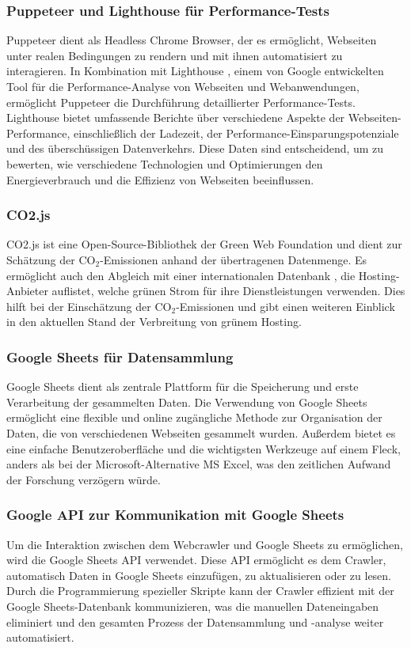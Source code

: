 \documentclass[Bachelor,BIF,german,IEEE]{BASE/twbook}
\begin{document}
\subsubsection{Puppeteer und Lighthouse für Performance-Tests}
Puppeteer \cite{PPTR24} dient als Headless Chrome Browser, der es ermöglicht, Webseiten unter realen Bedingungen zu rendern und mit ihnen automatisiert zu interagieren. In Kombination mit Lighthouse \cite{GLH24}, einem von Google entwickelten Tool für die Performance-Analyse von Webseiten und Webanwendungen, ermöglicht Puppeteer die Durchführung detaillierter Performance-Tests. Lighthouse bietet umfassende Berichte über verschiedene Aspekte der Webseiten-Performance, einschließlich der Ladezeit, der Performance-Einsparungspotenziale und des überschüssigen Datenverkehrs. Diese Daten sind entscheidend, um zu bewerten, wie verschiedene Technologien und Optimierungen den Energieverbrauch und die Effizienz von Webseiten beeinflussen.

\subsubsection{CO2.js}
CO2.js \cite{CO2JS24} ist eine Open-Source-Bibliothek der Green Web Foundation und dient zur Schätzung der CO$_2$-Emissionen anhand der übertragenen Datenmenge. Es ermöglicht auch den Abgleich mit einer internationalen Datenbank \cite{GHDB24}, die Hosting-Anbieter auflistet, welche grünen Strom für ihre Dienstleistungen verwenden. Dies hilft bei der Einschätzung der CO$_2$-Emissionen und gibt einen weiteren Einblick in den aktuellen Stand der Verbreitung von grünem Hosting.

\subsubsection{Google Sheets für Datensammlung}
Google Sheets dient als zentrale Plattform für die Speicherung und erste Verarbeitung der gesammelten Daten. Die Verwendung von Google Sheets ermöglicht eine flexible und online zugängliche Methode zur Organisation der Daten, die von verschiedenen Webseiten gesammelt wurden. Außerdem bietet es eine einfache Benutzeroberfläche und die wichtigsten Werkzeuge auf einem Fleck, anders als bei der Microsoft-Alternative MS Excel, was den zeitlichen Aufwand der Forschung verzögern würde.

\subsubsection{Google API zur Kommunikation mit Google Sheets}
Um die Interaktion zwischen dem Webcrawler und Google Sheets zu ermöglichen, wird die Google Sheets API \cite{GAPI24} verwendet. Diese API ermöglicht es dem Crawler, automatisch Daten in Google Sheets einzufügen, zu aktualisieren oder zu lesen. Durch die Programmierung spezieller Skripte kann der Crawler effizient mit der Google Sheets-Datenbank kommunizieren, was die manuellen Dateneingaben eliminiert und den gesamten Prozess der Datensammlung und -analyse weiter automatisiert.
\end{document}
